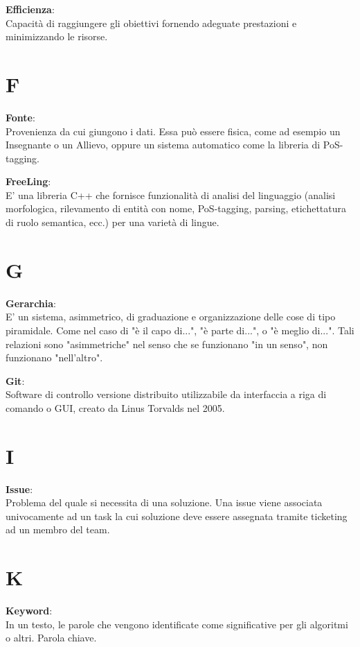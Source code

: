 \documentclass[a4paper, oneside, openany, dvipsnames, table]{article}
\begin{document}
\textbf{Efficienza}:\\	Capacità di raggiungere gli obiettivi fornendo adeguate prestazioni e minimizzando le risorse.


\newpage
\section{F}
\textbf{Fonte}:\\	Provenienza da cui giungono i dati. Essa può essere fisica, come ad esempio un Insegnante o un Allievo, oppure un sistema automatico come la libreria di PoS-tagging.

\textbf{FreeLing}:\\	E' una libreria C++ che fornisce funzionalità di analisi del linguaggio (analisi morfologica, rilevamento di entità con nome, PoS-tagging, parsing, etichettatura di ruolo semantica, ecc.) per una varietà di lingue.


\newpage
\section{G}
\textbf{Gerarchia}:\\ E' un sistema, asimmetrico, di graduazione e organizzazione delle cose di tipo piramidale.  
Come nel caso di "è il capo di...", "è parte di...", o "è meglio di...". Tali relazioni sono "asimmetriche" nel senso che se funzionano "in un senso", non funzionano "nell'altro".

\textbf{Git}:\\	 Software di controllo versione distribuito utilizzabile da interfaccia a riga di comando o GUI, creato da Linus Torvalds nel 2005.


\newpage
\section{I}
\textbf{Issue}:\\	Problema del quale si necessita di una soluzione. Una issue viene associata univocamente ad un task la cui soluzione deve essere assegnata tramite ticketing ad un membro del team.


\newpage
\section{K}
\textbf{Keyword}:\\	In un testo, le parole che vengono identificate come significative per gli algoritmi o altri. Parola chiave.
\end{document}
